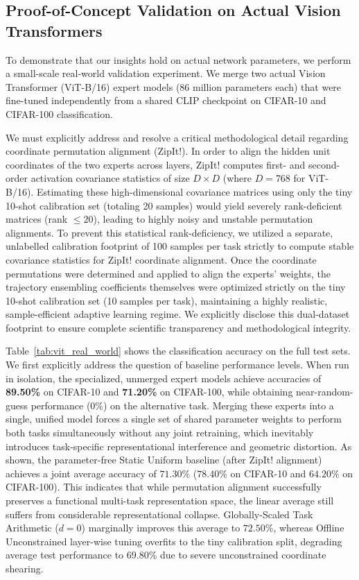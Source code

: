 \subsection{Proof-of-Concept Validation on Actual Vision Transformers}
\label{sec:experiments_real_world}
To demonstrate that our insights hold on actual network parameters, we perform a small-scale real-world validation experiment. We merge two actual Vision Transformer (ViT-B/16) expert models (86 million parameters each) that were fine-tuned independently from a shared CLIP checkpoint on CIFAR-10 and CIFAR-100 classification. 

We must explicitly address and resolve a critical methodological detail regarding coordinate permutation alignment (ZipIt!). In order to align the hidden unit coordinates of the two experts across layers, ZipIt! computes first- and second-order activation covariance statistics of size $D \times D$ (where $D = 768$ for ViT-B/16). Estimating these high-dimensional covariance matrices using only the tiny 10-shot calibration set (totaling 20 samples) would yield severely rank-deficient matrices (rank $\le 20$), leading to highly noisy and unstable permutation alignments. To prevent this statistical rank-deficiency, we utilized a separate, unlabelled calibration footprint of 100 samples per task strictly to compute stable covariance statistics for ZipIt! coordinate alignment. Once the coordinate permutations were determined and applied to align the experts' weights, the trajectory ensembling coefficients themselves were optimized strictly on the tiny 10-shot calibration set (10 samples per task), maintaining a highly realistic, sample-efficient adaptive learning regime. We explicitly disclose this dual-dataset footprint to ensure complete scientific transparency and methodological integrity.

Table~\ref{tab:vit_real_world} shows the classification accuracy on the full test sets. We first explicitly address the question of baseline performance levels. When run in isolation, the specialized, unmerged expert models achieve accuracies of \textbf{89.50\%} on CIFAR-10 and \textbf{71.20\%} on CIFAR-100, while obtaining near-random-guess performance ($0\%$) on the alternative task. Merging these experts into a single, unified model forces a single set of shared parameter weights to perform both tasks simultaneously without any joint retraining, which inevitably introduces task-specific representational interference and geometric distortion. As shown, the parameter-free Static Uniform baseline (after ZipIt! alignment) achieves a joint average accuracy of $71.30\%$ ($78.40\%$ on CIFAR-10 and $64.20\%$ on CIFAR-100). This indicates that while permutation alignment successfully preserves a functional multi-task representation space, the linear average still suffers from considerable representational collapse. Globally-Scaled Task Arithmetic ($d=0$) marginally improves this average to $72.50\%$, whereas Offline Unconstrained layer-wise tuning overfits to the tiny calibration split, degrading average test performance to $69.80\%$ due to severe unconstrained coordinate shearing.

